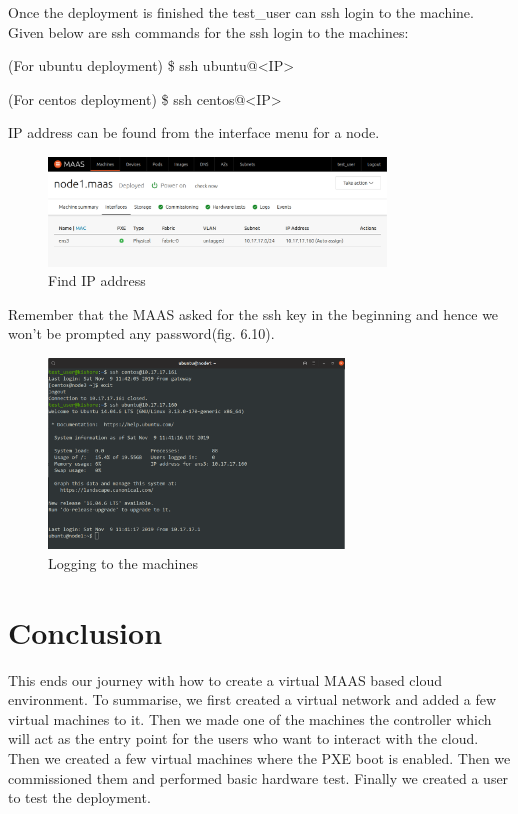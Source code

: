 Once the deployment is finished the test\_user can ssh login to the machine. Given below are ssh commands for the ssh login to the machines:

(For ubuntu deployment) \$ ssh ubuntu@\textless IP\textgreater

(For centos deployment) \$ ssh centos@\textless IP\textgreater

IP address can be found from the interface menu for a node.

\begin{figure}[!ht]
    \centering
    \includegraphics[width=0.8\textwidth]{images/6-9.png}
    \caption{Find IP address}
\end{figure}

Remember that the MAAS asked for the ssh key in the beginning and hence we won't be prompted any password(fig. 6.10).

\begin{figure}[!ht]
    \centering
    \includegraphics[width=0.7\textwidth]{images/6-10.png}
    \caption{Logging to the machines}
\end{figure}

\section{Conclusion}

This ends our journey with how to create a virtual MAAS based cloud environment. To summarise, we first created a virtual network and added a few virtual machines to it. Then we made one of the machines the controller which will act as the entry point for the users who want to interact with the cloud. Then we created a few virtual machines where the PXE boot is enabled. Then we commissioned them and performed basic hardware test. Finally we created a user to test the deployment.